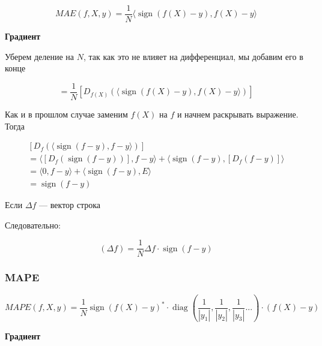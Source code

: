 \documentclass{article}
\begin{document}
    \begin{equation}
        MAE(f, X, y) = \frac{1}{N} \langle \operatorname{sign}(f(X) - y), f(X) - y \rangle
    \end{equation}

    \quad

    \textbf{Градиент}

    \quad 

    Уберем деление на $N$, так как это не влияет на дифференциал, мы добавим его в конце


    \begin{equation}
        [D_{f(X)}(MAE)] = \frac{1}{N} [D_{f(X)}(\langle \operatorname{sign}(f(X) - y), f(X) - y \rangle)]
    \end{equation}

    Как и в прошлом случае заменим $f(X)$ на $f$ и начнем раскрывать выражение. Тогда 

    \[
    \begin{gathered}
        [D_{f}(\langle \operatorname{sign}(f - y), f - y \rangle)] \\ 
        = \langle [D_{f}(\operatorname{sign}(f - y))], f - y \rangle + \langle \operatorname{sign}(f - y), [D_{f}(f - y)] \rangle \\
        = \langle 0, f - y \rangle + \langle \operatorname{sign}(f - y), E \rangle \\ 
        = \operatorname{sign}(f - y)
    \end{gathered}
    \]

    Если $\Delta f$ --- вектор строка

    Следовательно: 

    \begin{equation}
        [D_{w_{0}}(MAE)](\Delta f) = \frac{1}{N} \Delta f \cdot \operatorname{sign}(f - y) 
    \end{equation}

    \subsubsection{MAPE}

    \begin{equation}
        MAPE(f, X, y) = \frac{1}{N}  \operatorname{sign}(f(X) - y)^{*} \cdot \operatorname{diag}(\frac{1}{| y_{1} |}, \frac{1}{| y_{2} |}, \frac{1}{| y_{3} |} ...) \cdot (f(X) - y) 
    \end{equation}

    \quad 

    \textbf{Градиент}
\end{document}
